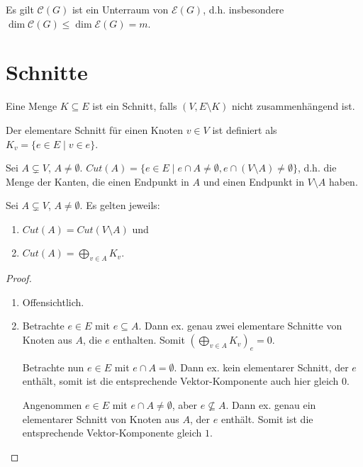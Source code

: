 \begin{proposition}
    Es gilt $ \mathcal{C}(G) $ ist ein Unterraum von $ \mathcal{E}(G) $, d.h. insbesondere $ \dim \mathcal{C}(G) \leq \dim \mathcal{E}(G) = m $.
\end{proposition}

\section{Schnitte}

\begin{definition}[Schnitt]
    Eine Menge $ K \subseteq E $ ist ein Schnitt, falls $ (V, E \setminus K) $ nicht zusammenhängend ist.
\end{definition}

\begin{definition}
    Der elementare Schnitt für einen Knoten $ v \in V $ ist definiert als $ K_v = \{ e \in E \mid v \in e \} $.
\end{definition}

\begin{definition}[Cut]
    Sei $ A \subsetneq V $, $ A \ne \emptyset $.
    $ Cut(A) = \{ e \in E \mid e \cap A \ne \emptyset, e \cap (V \setminus A) \ne \emptyset \} $, d.h. die Menge der Kanten, die einen Endpunkt in $ A $ und einen Endpunkt in $ V \setminus A $ haben.
\end{definition}

\begin{proposition}
    Sei $ A \subsetneq V $, $ A \ne \emptyset $.
    Es gelten jeweils:
    \begin{enumerate}
        \item $ Cut(A) = Cut(V \setminus A) $ und
        \item $ Cut(A) = \bigoplus_{v \in A} K_v $.
    \end{enumerate}
\end{proposition}

\begin{proof}
    \begin{enumerate}
        \item Offensichtlich.
        \item Betrachte $ e \in E $ mit $ e \subseteq A $.
        Dann ex. genau zwei elementare Schnitte von Knoten aus $ A $, die $ e $ enthalten.
        Somit $ (\bigoplus_{v \in A} K_v)_e = 0 $.

        Betrachte nun $ e \in E $ mit $ e \cap A = \emptyset $.
        Dann ex. kein elementarer Schnitt, der $ e $ enthält, somit ist die entsprechende Vektor-Komponente auch hier gleich $ 0 $.

        Angenommen $ e \in E $ mit $ e \cap A \ne \emptyset $, aber $ e \not \subseteq A $.
        Dann ex. genau ein elementarer Schnitt von Knoten aus $ A $, der $ e $ enthält.
        Somit ist die entsprechende Vektor-Komponente gleich $ 1 $.
    \end{enumerate}
\end{proof}

